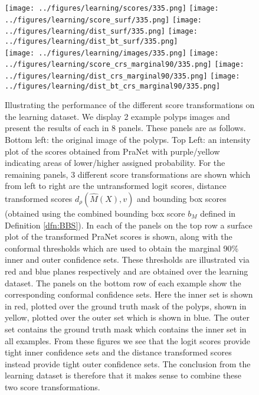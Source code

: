 \begin{figure}[h!]
\begin{center}
		\texttt{[image: ../figures/learning/scores/335.png]}\hspace{0.3cm}
	\texttt{[image: ../figures/learning/score\_surf/335.png]}\hspace{0.3cm}	\texttt{[image: ../figures/learning/dist\_surf/335.png]}\hspace{0.3cm}
	\texttt{[image: ../figures/learning/dist\_bt\_surf/335.png]}\hspace{0.3cm}\\
	\texttt{[image: ../figures/learning/images/335.png]}\hspace{0.3cm}
	\texttt{[image: ../figures/learning/score\_crs\_marginal90/335.png]}\hspace{0.3cm}
	\texttt{[image: ../figures/learning/dist\_crs\_marginal90/335.png]}\hspace{0.3cm}
	\texttt{[image: ../figures/learning/dist\_bt\_crs\_marginal90/335.png]}
\end{center}
	\caption{Illustrating the performance of the different score transformations on the learning dataset. We display 2 example polyps images and present the results of each in 8 panels. These panels are as follows. Bottom left: the original image of the polyps. Top Left: an intensity plot of the scores obtained from PraNet with purple/yellow indicating areas of lower/higher assigned probability. For the remaining panels, 3 different score transformations are shown which from left to right are the untransformed logit scores, distance transformed scores $d_\rho(\hat{M}(X), v)$ and bounding box scores (obtained using the combined bounding box score $b_M$ defined in Definition \ref{dfn:BBS}). In each of the panels on the top row a surface plot of the transformed PraNet scores is shown, along with the conformal thresholds which are used to obtain the marginal 90\% inner and outer confidence sets.  These thresholds are illustrated via red and blue planes respectively and are obtained over the learning dataset. The panels on the bottom row of each example show the corresponding conformal confidence sets. Here the inner set is shown in red, plotted over the ground truth mask of the polyps, shown in yellow, plotted over the outer set which is shown in blue. The outer set contains the ground truth mask which contains the inner set in all examples. From these figures we see that the logit scores provide tight inner confidence sets and the distance transformed scores instead provide tight outer confidence sets.
The conclusion from the learning dataset is therefore that it makes sense to combine these two score transformations.}
	\label{fig:learning}
	\vspace{-0.5cm}
\end{figure}
